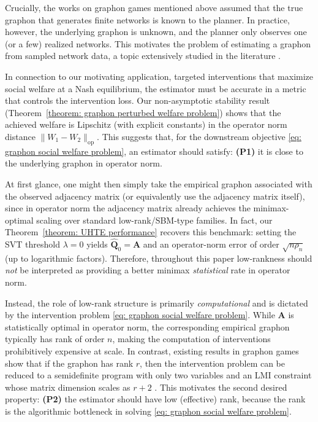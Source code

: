 \documentclass[11pt]{article}
\newcommand{\<}{\langle}
\renewcommand{\>}{\rangle}
\theoremstyle{plain}
\theoremstyle{definition}
\theoremstyle{remark}
\begin{document}
{Crucially, the works on graphon games mentioned above assumed that the true graphon that generates
finite networks is known to the planner. In practice, however, the underlying graphon is unknown,
and the planner only observes one (or a few) realized networks. This motivates the problem of
estimating a graphon from sampled network data, a topic extensively studied in the literature \citep{chatterjee2012,gao2014rate,klopp2017,klopp2019,xu2017}.

In connection to our motivating application, targeted interventions that maximize social welfare at a Nash
equilibrium, the estimator must be accurate in a metric that controls the intervention loss.
Our non-asymptotic stability result (Theorem~\ref{theorem: graphon perturbed welfare problem}) shows that the achieved welfare is Lipschitz (with explicit constants) in the operator norm distance
$\|W_1-W_2\|_{\mathrm{op}}$. This suggests that, for the downstream objective \eqref{eq: graphon social welfare problem}, an estimator should satisfy:
\textbf{(P1)} it is close to the underlying graphon in operator norm.

At first glance, one might then simply take the empirical graphon associated with the observed adjacency matrix
(or equivalently use the adjacency matrix itself), since in operator norm the adjacency matrix already achieves
the minimax-optimal scaling over standard low-rank/SBM-type families. In fact, our Theorem~\ref{theorem: UHTE performance} recovers this
benchmark: setting the SVT threshold $\lambda=0$ yields $\widehat{\mathbf Q}_{0}=\mathbf A$ and an operator-norm
error of order $\sqrt{n\rho_n}$ (up to logarithmic factors). Therefore, throughout this paper low-rankness
should \emph{not} be interpreted as providing a better minimax \emph{statistical} rate in operator norm.

Instead, the role of low-rank structure is primarily \emph{computational} and is dictated by the intervention
problem \eqref{eq: graphon social welfare problem}. While $\mathbf A$ is statistically optimal in operator norm, the corresponding empirical graphon
typically has rank of order $n$, making the computation of interventions prohibitively expensive at scale.
In contrast, existing results in graphon games show that if the graphon has rank $r$, then the intervention
problem can be reduced to a semidefinite program with only two variables and an LMI constraint whose matrix
dimension scales as $r+2$ \citep{Parise_Ozdaglar_Econometrica}. This motivates the second desired property:
\textbf{(P2)} the estimator should have low (effective) rank, because the rank is the algorithmic bottleneck
in solving \eqref{eq: graphon social welfare problem}.

}
\end{document}
